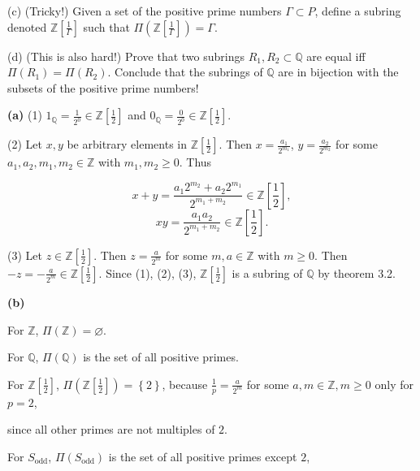 (c) (Tricky!) Given a set of the positive prime numbers \(\Gamma \subset P\), define a subring denoted \(\mathbb{Z}\left\lbrack \frac{1}{\Gamma} \right\rbrack\) such that \(\Pi\left( {\mathbb{Z}\left\lbrack \frac{1}{\Gamma} \right\rbrack} \right) = \Gamma\).

(d) (This is also hard!) Prove that two subrings \(R_{1},R_{2} \subset \mathbb{Q}\) are equal iff \(\Pi\left( R_{1} \right) = \Pi\left( R_{2} \right)\). Conclude that the subrings of \(\mathbb{Q}\) are in bijection with the subsets of the positive prime numbers!

\textbf{(a)} (1) \(1_{\mathbb{Q}} = \frac{1}{2^{0}} \in \mathbb{Z}\left\lbrack \frac{1}{2} \right\rbrack\) and \(0_{\mathbb{Q}} = \frac{0}{2^{0}} \in \mathbb{Z}\left\lbrack \frac{1}{2} \right\rbrack\).

(2) Let \(x,y\) be arbitrary elements in \(\mathbb{Z}\left\lbrack \frac{1}{2} \right\rbrack\). Then \(x = \frac{a_{1}}{2^{m_{1}}}\), \(y = \frac{a_{2}}{2^{m_{2}}}\) for some \(a_{1},a_{2},m_{1},m_{2} \in \mathbb{Z}\) with \(m_{1},m_{2} \geq 0\). Thus

\[x + y = \frac{a_{1}2^{m_{2}} + a_{2}2^{m_{1}}}{2^{m_{1} + m_{2}}} \in \mathbb{Z}\left\lbrack \frac{1}{2} \right\rbrack,\]\[xy = \frac{a_{1}a_{2}}{2^{m_{1} + m_{2}}} \in \mathbb{Z}\left\lbrack \frac{1}{2} \right\rbrack.\]

(3) Let \(z \in \mathbb{Z}\left\lbrack \frac{1}{2} \right\rbrack\). Then \(z = \frac{a}{2^{m}}\) for some \(m,a \in \mathbb{Z}\) with \(m \geq 0\). Then \(- z = - \frac{a}{2^{m}} \in \mathbb{Z}\left\lbrack \frac{1}{2} \right\rbrack\). Since (1), (2), (3), \(\mathbb{Z}\left\lbrack \frac{1}{2} \right\rbrack\) is a subring of \(\mathbb{Q}\) by theorem 3.2.

\textbf{(b)}

For \(\mathbb{Z}\), \(\Pi\left( \mathbb{Z} \right) = \varnothing\).

For \(\mathbb{Q}\), \(\Pi\left( \mathbb{Q} \right)\) is the set of all positive primes.

For \(\mathbb{Z}\left\lbrack \frac{1}{2} \right\rbrack\), \(\Pi\left( {\mathbb{Z}\left\lbrack \frac{1}{2} \right\rbrack} \right) = \left\{ 2 \right\}\), because \(\frac{1}{p} = \frac{a}{2^{m}}\) for some \(a,m \in \mathbb{Z},m \geq 0\) only for \(p = 2\),

since all other primes are not multiples of \(2\).

For \(S_{\text{odd}}\), \(\Pi\left( S_{\text{odd}} \right)\) is the set of all positive primes except \(2\),

